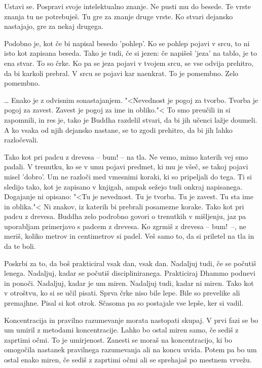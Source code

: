 
Ustavi se. Pospravi svoje intelektualno znanje. Ne pusti mu do besede. Te vrste znanja tu ne potrebuješ. Tu gre za znanje druge vrste. Ko stvari dejansko nastajajo, gre za nekaj drugega.

Podobno je, kot če bi napisal besedo 'pohlep'. Ko se pohlep pojavi v srcu, to ni isto kot zapisana beseda. Tako je tudi, če si jezen: če napišeš 'jeza' na tablo, je to ena stvar. To so črke. Ko pa se jeza pojavi v tvojem srcu, se vse odvija prehitro, da bi karkoli prebral. V srcu se pojavi kar naenkrat. To je pomembno. Zelo pomembno.

\clearpage


\ldots{} Enako je z odvisnim sonastajanjem. "<Nevednost je pogoj za tvorbo. Tvorba je pogoj za zavest. Zavest je pogoj za ime in obliko."< To smo preučili in si zapomnili, in res je, tako je Buddha razdelil stvari, da bi jih učenci lažje doumeli. A ko vsaka od njih dejansko nastane, se to zgodi prehitro, da bi jih lahko razločevali.

Tako kot pri padcu z drevesa – bum! – na tla. Ne vemo, mimo katerih vej smo padali. V trenutku, ko se v umu pojavi predmet, ki mu je všeč, se takoj pojavi misel 'dobro'. Um ne razloči med vmesnimi koraki, ki so pripeljali do tega. Ti si sledijo tako, kot je zapisano v knjigah, ampak sežejo tudi onkraj napisanega. Dogajanje ni opisano: "<Tu je nevednost. Tu je tvorba. Tu je zavest. Tu sta ime in oblika."< Ni znakov, iz katerih bi prebrali posamezne korake. Tako kot pri padcu z drevesa. Buddha zelo podrobno govori o trenutkih v mišljenju, jaz pa uporabljam primerjavo s padcem z drevesa. Ko zgrmiš z drevesa – bum! –, ne meriš, koliko metrov in centimetrov si padel. Veš samo to, da si priletel na tla in da te boli.

\clearpage


Poskrbi za to, da boš prakticiral vsak dan, vsak dan. Nadaljuj tudi, če se počutiš lenega. Nadaljuj, kadar se počutiš discipliniranega. Prakticiraj Dhammo podnevi in ponoči. Nadaljuj, kadar je um miren. Nadaljuj tudi, kadar ni miren. Tako kot v otroštvu, ko si se učil pisati. Sprva črke niso bile lepe. Bile so prevelike ali premajhne. Pisal si kot otrok. Sčasoma pa so postajale vse lepše, ker si vadil.


Koncentracija in pravilno razumevanje morata nastopati skupaj. V prvi fazi se bo um umiril z metodami koncentracije. Lahko bo ostal miren samo, če sediš z zaprtimi očmi. To je umirjenost. Zanesti se moraš na koncentracijo, ki bo omogočila nastanek pravilnega razumevanja ali na koncu uvida. Potem pa bo um ostal enako miren, če sediš z zaprtimi očmi ali se sprehajaš po mestnem vrvežu.

